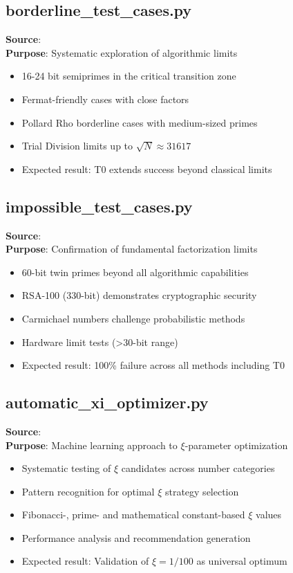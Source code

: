 	\subsection{borderline\_test\_cases.py}
	\textbf{Source}: \\
	\textbf{Purpose}: Systematic exploration of algorithmic limits
	\begin{itemize}
		\item 16-24 bit semiprimes in the critical transition zone
		\item Fermat-friendly cases with close factors
		\item Pollard Rho borderline cases with medium-sized primes
		\item Trial Division limits up to $\sqrt{N} \approx 31617$
		\item Expected result: T0 extends success beyond classical limits
	\end{itemize}
	
	\subsection{impossible\_test\_cases.py}
	\textbf{Source}: \\
	\textbf{Purpose}: Confirmation of fundamental factorization limits
	\begin{itemize}
		\item 60-bit twin primes beyond all algorithmic capabilities
		\item RSA-100 (330-bit) demonstrates cryptographic security
		\item Carmichael numbers challenge probabilistic methods
		\item Hardware limit tests (>30-bit range)
		\item Expected result: 100\% failure across all methods including T0
	\end{itemize}
	
	\subsection{automatic\_xi\_optimizer.py}
	\textbf{Source}: \\
	\textbf{Purpose}: Machine learning approach to $\xi$-parameter optimization
	\begin{itemize}
		\item Systematic testing of $\xi$ candidates across number categories
		\item Pattern recognition for optimal $\xi$ strategy selection
		\item Fibonacci-, prime- and mathematical constant-based $\xi$ values
		\item Performance analysis and recommendation generation
		\item Expected result: Validation of $\xi = 1/100$ as universal optimum
	\end{itemize}
	
